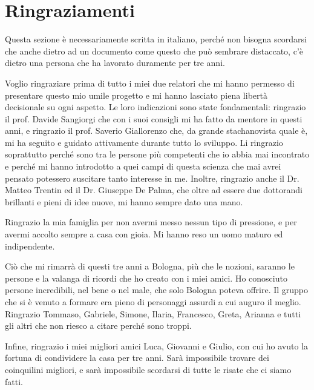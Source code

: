 \cleardoublepage %
{}
\chapter*{Ringraziamenti}
\pagestyle{empty}
\thispagestyle{empty}

Questa sezione è necessariamente scritta in italiano,
perché non bisogna scordarsi che anche dietro ad un documento come questo
che può sembrare distaccato, c'è dietro una persona che ha lavorato duramente per tre anni.

Voglio ringraziare prima di tutto i miei due relatori che mi hanno
permesso di presentare questo mio umile progetto e mi hanno lasciato piena
libertà decisionale su ogni aspetto. Le loro indicazioni sono state fondamentali:
ringrazio il prof. Davide Sangiorgi che con i suoi consigli
mi ha fatto da mentore in questi anni, e ringrazio il prof. Saverio Giallorenzo
che, da grande stachanovista quale è, mi ha seguito e guidato attivamente durante
tutto lo sviluppo. Li ringrazio soprattutto perché sono tra le persone più competenti
che io abbia mai incontrato e perché mi hanno introdotto a quei campi di questa scienza
che mai avrei pensato potessero suscitare tanto interesse in me.
Inoltre, ringrazio anche il Dr. Matteo Trentin ed il Dr. Giuseppe De Palma,
che oltre ad essere due dottorandi brillanti e pieni di idee nuove, mi hanno sempre dato una mano.

Ringrazio la mia famiglia per non avermi messo nessun tipo di pressione,
e per avermi accolto sempre a casa con gioia. Mi hanno reso un uomo maturo ed indipendente.

Ciò che mi rimarrà di questi tre anni a Bologna, più che le nozioni,
saranno le persone e la valanga di ricordi che ho creato con i miei amici.
Ho conosciuto persone incredibili, nel bene o nel male, che solo Bologna poteva offrire.
Il gruppo che si è venuto a formare era pieno di personaggi assurdi a cui auguro il meglio.
Ringrazio Tommaso, Gabriele, Simone, Ilaria, Francesco, Greta, Arianna e tutti gli altri
che non riesco a citare perché sono troppi.

Infine, ringrazio i miei migliori amici Luca, Giovanni e Giulio,
con cui ho avuto la fortuna di condividere la casa per tre anni.
Sarà impossibile trovare dei coinquilini migliori, e sarà impossibile
scordarsi di tutte le risate che ci siamo fatti.

\clearpage
